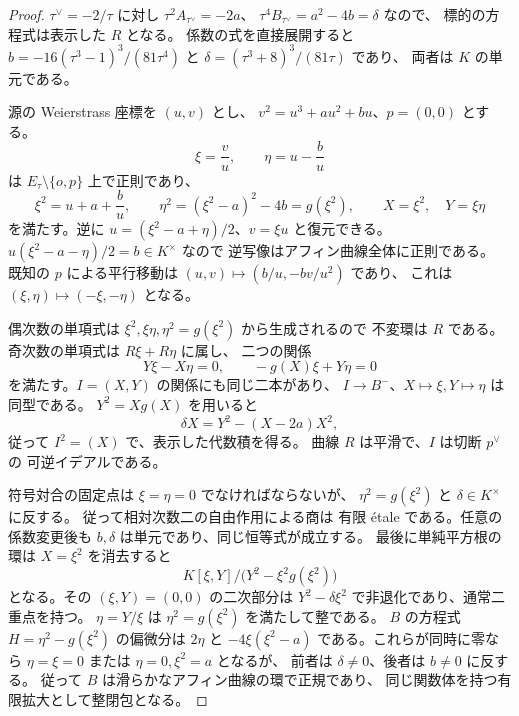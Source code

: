 \begin{proof}
$\tau^\vee=-2/\tau$ に対し
$\tau^2A_{\tau^\vee}=-2a$、
$\tau^4B_{\tau^\vee}=a^2-4b=\delta$ なので、
標的の方程式は表示した $R$ となる。
係数の式を直接展開すると
$b=-16(\tau^3-1)^3/(81\tau^4)$ と
$\delta=(\tau^3+8)^3/(81\tau)$ であり、
両者は $K$ の単元である。

源の Weierstrass 座標を $(u,v)$ とし、
$v^2=u^3+au^2+bu$、$p=(0,0)$ とする。
\[
 \xi=\frac vu,\qquad
 \eta=u-\frac bu
\]
は $E_\tau\setminus\{o,p\}$ 上で正則であり、
\[
 \xi^2=u+a+\frac bu,\qquad
 \eta^2=(\xi^2-a)^2-4b=g(\xi^2),\qquad
 X=\xi^2,\quad Y=\xi\eta
\]
を満たす。逆に
$u=(\xi^2-a+\eta)/2$、$v=\xi u$ と復元できる。
$u(\xi^2-a-\eta)/2=b\in K^\times$ なので
逆写像はアフィン曲線全体に正則である。
既知の $p$ による平行移動は
$(u,v)\mapsto(b/u,-bv/u^2)$ であり、
これは $(\xi,\eta)\mapsto(-\xi,-\eta)$ となる。

偶次数の単項式は
$\xi^2,\xi\eta,\eta^2=g(\xi^2)$ から生成されるので
不変環は $R$ である。
奇次数の単項式は $R\xi+R\eta$ に属し、
二つの関係
\[
 Y\xi-X\eta=0,\qquad
 -g(X)\xi+Y\eta=0
\]
を満たす。$I=(X,Y)$ の関係にも同じ二本があり、
$I\to B^-$、$X\mapsto\xi,Y\mapsto\eta$ は同型である。
$Y^2=Xg(X)$ を用いると
\[
 \delta X=Y^2-(X-2a)X^2,
\]
従って $I^2=(X)$ で、表示した代数積を得る。
曲線 $R$ は平滑で、$I$ は切断 $p^\vee$ の
可逆イデアルである。

符号対合の固定点は $\xi=\eta=0$ でなければならないが、
$\eta^2=g(\xi^2)$ と $\delta\in K^\times$ に反する。
従って相対次数二の自由作用による商は
有限 \'{e}tale である。任意の係数変更後も
$b,\delta$ は単元であり、同じ恒等式が成立する。
最後に単純平方根の環は $X=\xi^2$ を消去すると
\[
 K[\xi,Y]/\bigl(Y^2-\xi^2g(\xi^2)\bigr)
\]
となる。その $(\xi,Y)=(0,0)$ の二次部分は
$Y^2-\delta\xi^2$ で非退化であり、通常二重点を持つ。
$\eta=Y/\xi$ は $\eta^2=g(\xi^2)$ を満たして整である。
$B$ の方程式 $H=\eta^2-g(\xi^2)$ の偏微分は
$2\eta$ と $-4\xi(\xi^2-a)$ である。これらが同時に零なら
$\eta=\xi=0$ または $\eta=0,\xi^2=a$ となるが、
前者は $\delta\ne0$、後者は $b\ne0$ に反する。
従って $B$ は滑らかなアフィン曲線の環で正規であり、
同じ関数体を持つ有限拡大として整閉包となる。
\end{proof}

